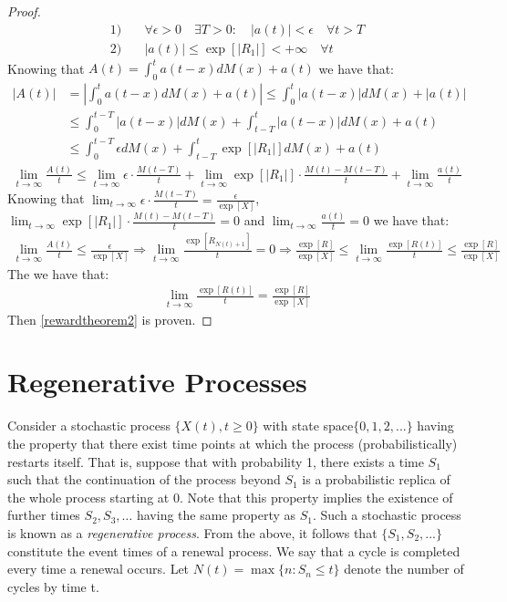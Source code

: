 \begin{proof}
	\begin{align*}
		1) \quad & \forall \epsilon>0 \quad \exists T>0:\quad |a(t)|<\epsilon \quad \forall t>T
		\\ 2) \quad & |a(t)| \leq \exp[|R_1|]<+\infty \quad \forall t
	\end{align*}
	Knowing that $A(t)=\int_{0}^{t}a(t-x)dM(x)+a(t)$ we have that:
	\begin{align*}
		|A(t)| & = |\int_{0}^{t}a(t-x)dM(x)+a(t)| \leq \int_{0}^{t}|a(t-x)|dM(x)+|a(t)|
		\\ & \leq \int_{0}^{t-T}|a(t-x)|dM(x)+ \int_{t-T}^{t}|a(t-x)|dM(x) + a(t)
		\\ & \leq \int_{0}^{t-T}\epsilon dM(x)+ \int_{t-T}^{t}\exp[|R_1|] dM(x) + a(t)
	\end{align*}
	\begin{align*}
		\lim_{t \to \infty} \frac{A(t)}{t} \leq \lim_{t \to \infty} \epsilon \cdot \frac{M(t-T)}{t} + \lim_{t \to \infty} \exp[|R_1|]\cdot \frac{M(t)-M(t-T)}{t} + \lim_{t \to \infty} \frac{a(t)}{t}
	\end{align*}
	Knowing that $\lim_{t \to \infty} \epsilon \cdot \frac{M(t-T)}{t}=\frac{\epsilon}{\exp[X]}$, $\lim_{t \to \infty} \exp[|R_1|]\cdot \frac{M(t)-M(t-T)}{t}=0$ and $\lim_{t \to \infty} \frac{a(t)}{t}=0$ we have that:
	\begin{align*}
		\lim_{t \to \infty} \frac{A(t)}{t} \leq \frac{\epsilon}{\exp[X]} \Rightarrow \lim_{t \to \infty} \frac{\exp[R_{N(t)+1}]}{t}=0 \Rightarrow \frac {\exp[R]}{\exp[X]} \leq \lim_{t \to \infty} \frac{\exp[R(t)]}{t} \leq \frac{\exp[R]}{\exp[X]}
	\end{align*}
	The we have that:
	\begin{align*}
		\lim_{t \to \infty} \frac{\exp[R(t)]}{t} = \frac{\exp[R]}{\exp[X]}
	\end{align*}
	Then \ref{rewardtheorem2} is proven.
\end{proof}

\section{Regenerative Processes}

Consider a stochastic process $\{X(t), t \geq 0\}$ with state space$\{0, 1, 2, ... \}$ having
the property that there exist time points at which the process (probabilistically) restarts itself. That is, suppose that with probability 1, there exists a time $S_1$
such that the continuation of the process beyond $S_1$ is a probabilistic replica
of the whole process starting at 0. Note that this property implies the existence
of further times $S_2 , S_3 , \dots$ having the same property as $S_1$. Such a stochastic
process is known as a \emph{regenerative process}.
From the above, it follows that $\{S_1 , S_2 , ...\}$ constitute the event times of
a renewal process. We say that a cycle is completed every time a renewal
occurs. Let $N(t) = \max\{n: S_n \leq t\}$ denote the number of cycles by time t.


